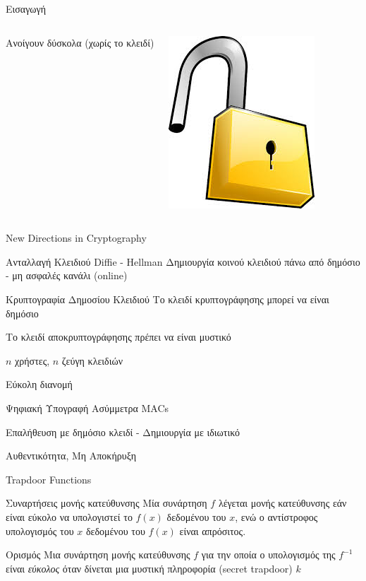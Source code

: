 \documentclass[handout]{beamer}
\begin{document}
\begin{frame}[allowframebreaks]{Εισαγωγή}
\begin{columns}
\begin{small}
Aνοίγουν δύσκολα (χωρίς το κλειδί)
 
\end{small}
\includegraphics[scale=0.3]{padlock.jpg}
\end{columns}

\end{frame}

\begin{frame}{New Directions in Cryptography}

\begin{block}{Ανταλλαγή Κλειδιού Diffie - Hellman}
Δημιουργία κοινού κλειδιού πάνω από δημόσιο - μη ασφαλές κανάλι (online)
\end{block}

\begin{block}{Κρυπτογραφία Δημοσίου Κλειδιού}
Το κλειδί κρυπτογράφησης μπορεί να είναι δημόσιο

Το κλειδί αποκρυπτογράφησης πρέπει να είναι μυστικό

$n$ χρήστες, $n$ ζεύγη κλειδιών

Εύκολη διανομή
\end{block}

\begin{block}{Ψηφιακή Υπογραφή}
Ασύμμετρα MACs

Επαλήθευση με δημόσιο κλειδί - Δημιουργία με ιδιωτικό

Αυθεντικότητα, Μη Αποκήρυξη 
\end{block}

\end{frame}

\begin{frame}{Trapdoor Functions}

\begin{block}{Συναρτήσεις μονής κατεύθυνσης}
Μία συνάρτηση $f$  λέγεται μονής κατεύθυνσης εάν είναι εύκολο να υπολογιστεί το $f(x)$ δεδομένου του $x$, ενώ ο αντίστροφος υπολογισμός του $x$ δεδομένου του $f(x)$ είναι απρόσιτος.
\end{block}
\pause

\begin{block}{Ορισμός}
Mια συνάρτηση μονής κατεύθυνσης $f$ για την οποία ο υπολογισμός της $f^{−1}$ είναι \emph{εύκολος} όταν δίνεται μια μυστική πληροφορία (secret trapdoor) $k$
\end{block}

\end{frame}
\end{document}
